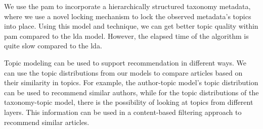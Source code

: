 We use the \gls{pam} to incorporate a hierarchically structured taxonomy metadata, where we use a novel locking mechanism to lock the observed metadata's topics into place.
Using this model and technique, we can get better topic quality within \gls{pam} compared to the \gls{lda} model.
However, the elapsed time of the algorithm is quite slow compared to the \gls{lda}.

Topic modeling can be used to support recommendation in different ways.
We can use the topic distributions from our models to compare articles based on their similarity in topics.
For example, the author-topic model's topic distribution can be used to recommend similar authors, while for the topic distributions of the taxonomy-topic model, there is the possibility of looking at topics from different layers.
This information can be used in a content-based filtering approach to recommend similar articles.

